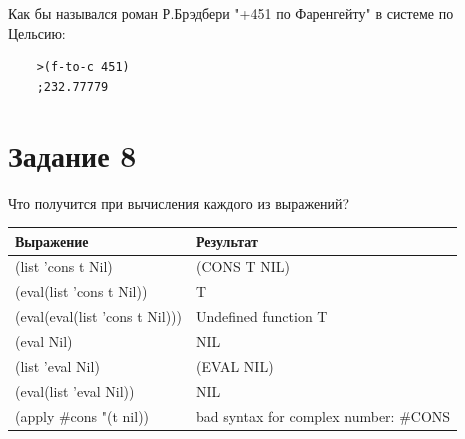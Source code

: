 \documentclass[a4paper, 12pt]{article}
\begin{document}
Как бы назывался роман Р.Брэдбери "+451 по Фаренгейту" в системе по Цельсию:
\\
\begin{lstlisting}
	>(f-to-c 451)
	;232.77779
\end{lstlisting}


\section*{Задание 8}
Что получится при вычисления каждого из выражений?\\
\hspace*{20mm}\begin{tabular}{ | l | l | }
	\hline
	\textbf{Выражение} & \textbf{Результат} \\ \hline
	(list 'cons t Nil) & (CONS T NIL) \\ \hline
	(eval(list 'cons t Nil)) & T \\ \hline
	(eval(eval(list 'cons t Nil))) & Undefined function T \\ \hline
	(eval Nil) & NIL \\ \hline
	(list 'eval Nil) & (EVAL NIL) \\ \hline
	(eval(list 'eval Nil)) & NIL \\ \hline
	(apply \#cons "(t nil)) & bad syntax for complex number: \#CONS \\ \hline
\end{tabular}
\end{document}
